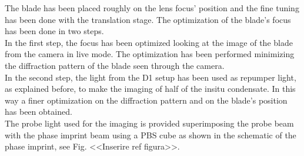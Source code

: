 \documentclass[../thesis.tex]{subfiles}
\begin{document}
The blade has been placed roughly on the lens focus' position and the fine tuning has been done with the translation stage. The optimization of the blade's focus has been done in two steps.\\
In the first step, the focus has been optimized looking at the image of the blade from the camera in live mode. The optimization has been performed minimizing the diffraction pattern of the blade seen through the camera.\\
In the second step, the light from the D1 setup has been used as repumper light, as explained before, to make the imaging of half of the insitu condensate. In this way a finer optimization on the diffraction pattern and on the blade's position has been obtained.\\
The probe light used for the imaging is provided superimposing the probe beam with the phase imprint beam using a PBS cube as shown in the schematic of the phase imprint, see Fig. <<Inserire ref figura>>.\\
\end{document}
